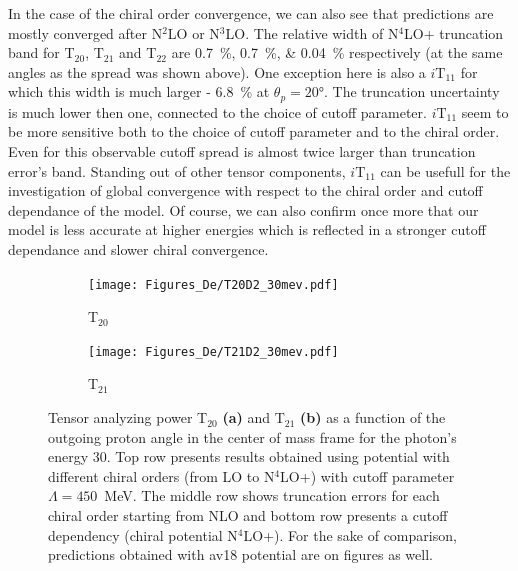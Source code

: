     In the case of the chiral order convergence, we can
    also see that predictions are mostly converged after N$^2$LO or N$^3$LO.
    The relative width of N$^4$LO+ truncation band 
    for T$_{20}$, T$_{21}$ and T$_{22}$
    are \SIlist{0.7; 0.7; 0.04}{\percent} respectively (at the same angles as the spread was shown above).
    One exception here is also a $i\text{T}_{11}$ for which this width is much larger - \SI{6.8}{\percent} at $\theta_p = \ang{20}$.
    The truncation uncertainty is much lower then one,
    connected to the choice of cutoff parameter.
    $i\text{T}_{11}$ seem to be more sensitive both
    to the choice of cutoff parameter and to the chiral order. Even for this observable cutoff spread is almost twice larger than truncation error's band.
    Standing out of other tensor components, $i\text{T}_{11}$ can be usefull for the investigation of global 
    convergence  with respect to the chiral order and cutoff dependance of the model.
    Of course, we can also confirm once more that 
    our model is less accurate at higher energies which is reflected
    in a stronger cutoff dependance and slower chiral convergence.


    \begin{figure}[htb]
        \centering
        \begin{subfigure}[b]{0.46\textwidth}
            \texttt{[image: Figures\_De/T20D2\_30mev.pdf]}
            \caption{T$_{20}$}
            \label{T20_30_vert}
        \end{subfigure}
        \begin{subfigure}[b]{0.46\textwidth}
            \texttt{[image: Figures\_De/T21D2\_30mev.pdf]}
            \caption{T$_{21}$}
            \label{T21_30_vert}
        \end{subfigure}
        \caption{Tensor analyzing power T$_{20}$  {\bf (a)}
        and T$_{21}$ {\bf (b)}
        as a function of the outgoing proton angle in the center of mass frame 
        for the photon's energy \SI{30}{\mev}.
        Top row presents results obtained using potential
        with different chiral orders (from LO to N$^4$LO+) with cutoff parameter $\Lambda=450$~MeV.
        The middle row shows truncation errors for each 
        chiral order starting from NLO and
        bottom row presents a cutoff dependency (chiral potential N$^4$LO+).
        For the sake of comparison, predictions obtained with \gls*{av18} potential are on figures as well.}
        \label{T20_T21_30}
    \end{figure}

